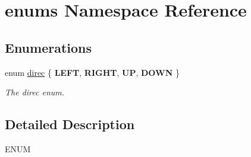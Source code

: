\hypertarget{namespaceenums}{}\section{enums Namespace Reference}
\label{namespaceenums}
\subsection*{Enumerations}
\begin{DoxyCompactItemize}
\item 
enum \hyperlink{namespaceenums_a7ff51311a3534659d8a22816d0723d63}{direc} \{ {\bfseries L\+E\+FT}, 
{\bfseries R\+I\+G\+HT}, 
{\bfseries UP}, 
{\bfseries D\+O\+WN}
 \}\hypertarget{namespaceenums_a7ff51311a3534659d8a22816d0723d63}{}\label{namespaceenums_a7ff51311a3534659d8a22816d0723d63}
\begin{DoxyCompactList}\small\item\em The direc enum. \end{DoxyCompactList}
\end{DoxyCompactItemize}


\subsection{Detailed Description}
E\+N\+UM 